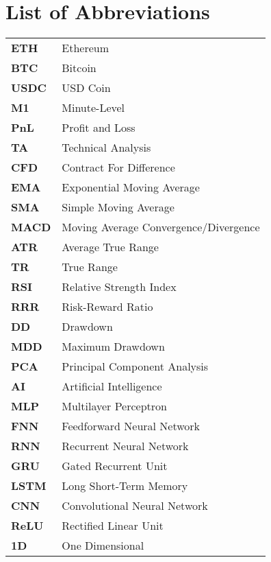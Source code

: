 \section*{List of Abbreviations}

\begin{tabularx}{\textwidth}{@{}lL{0.8\textwidth}@{}}
    \textbf{ETH}  & Ethereum                              \\
    \textbf{BTC}  & Bitcoin                               \\
    \textbf{USDC} & USD Coin                              \\
    \textbf{M1}   & Minute-Level                          \\


    \textbf{PnL}  & Profit and Loss                       \\
    \textbf{TA}   & Technical Analysis                    \\
    \textbf{CFD}  & Contract For Difference               \\
    \textbf{EMA}  & Exponential Moving Average            \\
    \textbf{SMA}  & Simple Moving Average                 \\
    \textbf{MACD} & Moving Average Convergence/Divergence \\
    \textbf{ATR}  & Average True Range                    \\
    \textbf{TR}   & True Range                            \\
    \textbf{RSI}  & Relative Strength Index               \\
    \textbf{RRR}  & Risk-Reward Ratio                     \\
    \textbf{DD}   & Drawdown                              \\
    \textbf{MDD}  & Maximum Drawdown                      \\

    \textbf{PCA}  & Principal Component Analysis          \\
    \textbf{AI}   & Artificial Intelligence               \\
    \textbf{MLP}  & Multilayer Perceptron                 \\
    \textbf{FNN}  & Feedforward Neural Network            \\
    \textbf{RNN}  & Recurrent Neural Network              \\
    \textbf{GRU}  & Gated Recurrent Unit                  \\
    \textbf{LSTM} & Long Short-Term Memory                \\
    \textbf{CNN}  & Convolutional Neural Network          \\
    \textbf{ReLU} & Rectified Linear Unit                 \\
    \textbf{1D}   & One Dimensional                       \\


\end{tabularx}
